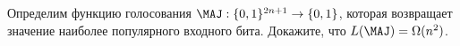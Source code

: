 Определим функцию голосования $\MAJ: \{0, 1\}^{2n + 1} \to \{0, 1\}$, которая возвращает значение
наиболее популярного входного бита. Докажите, что $L(\MAJ) = \Omega(n^2)$.
    